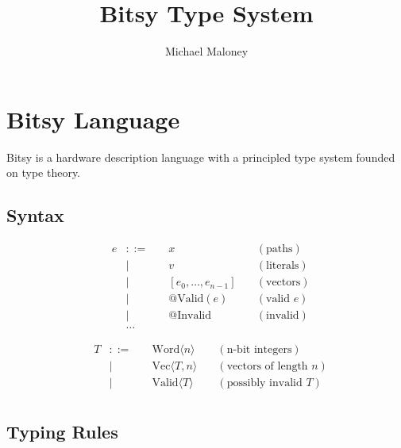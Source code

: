 \documentclass{article}
\newcommand{\word}[1]{\text{Word}\langle #1 \rangle}
\newcommand{\vect}[2]{\text{Vec}\langle #1, #2 \rangle}
\newcommand{\valid}[1]{\text{Valid}\langle #1 \rangle}
\begin{document}
\title{Bitsy Type System}
\author{Michael Maloney}
\maketitle

\section{Bitsy Language}
Bitsy is a hardware description language with a principled type system founded on type theory.

\subsection{Syntax}

\begin{align*}
    &e &::= &\quad x \quad &(\text{paths}) \\
    &&| &\quad v \quad &(\text{literals}) \\
    &&| &\quad [e_0, \dots, e_{n-1}] \quad &(\text{vectors}) \\
    &&| &\quad @\text{Valid}(e) \quad &(\text{valid } e) \\
    &&| &\quad @\text{Invalid} \quad &(\text{invalid}) \\
    && \dots
\end{align*}

\begin{align*}
    &T &::= &\quad \word{n} \quad &(\text{n-bit integers}) \\
    &&| &\quad \vect{T}{n} \quad &(\text{vectors of length } n) \\
    &&| &\quad \valid{T} \quad &(\text{possibly invalid } T) \\
\end{align*}

\subsection{Typing Rules}
\end{document}
